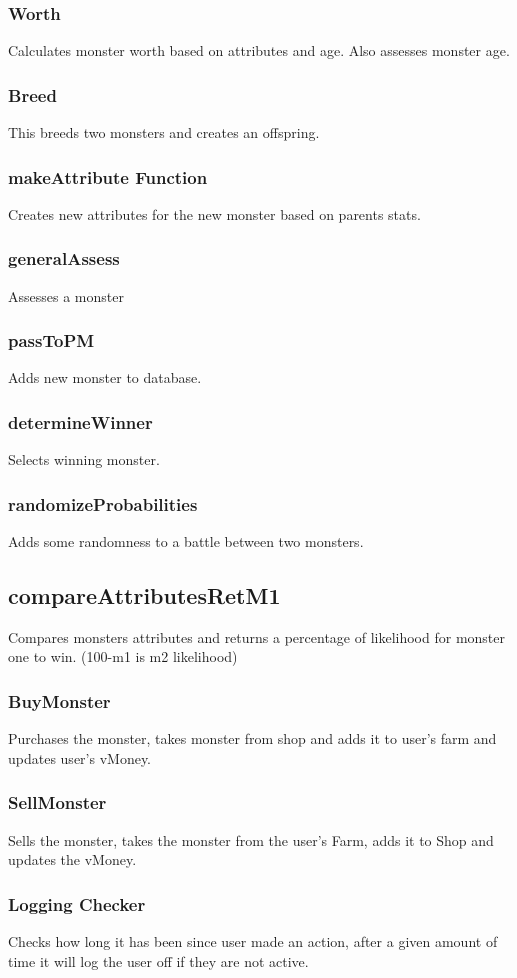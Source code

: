 \documentclass[titlepage]{article}
\begin{document}
\subsubsection{Worth}
Calculates monster worth based on attributes and age. Also assesses monster age.
\subsubsection{Breed}
This breeds two monsters and creates an offspring.
\subsubsection{makeAttribute Function}
Creates new attributes for the new monster based on parents stats.
\subsubsection{generalAssess}
Assesses a monster
\subsubsection{passToPM}
Adds new monster to database.
\subsubsection {determineWinner}
Selects winning monster.
\subsubsection {randomizeProbabilities}
Adds some randomness to a battle between two monsters.
\subsection {compareAttributesRetM1}
Compares monsters attributes and returns a percentage of likelihood for monster one to win. (100-m1 is m2 likelihood)
\subsubsection{BuyMonster}
Purchases the monster, takes monster from shop and adds it to user's farm and updates user's vMoney.
\subsubsection{SellMonster}
Sells the monster, takes the monster from the user's Farm, adds it to Shop and updates the vMoney.
\subsubsection{Logging Checker}
Checks how long it has been since user made an action, after a given amount of time it will log the user off
if they are not active.
\end{document}
